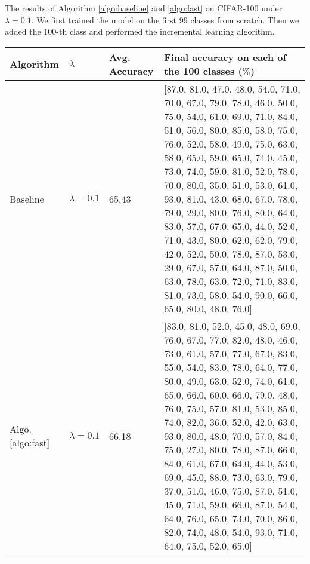 \begin{table}[!hpb]
	\centering
	{The results of Algorithm \ref{algo:baseline} and \ref{algo:fast} on CIFAR-100 under $\lambda=0.1$. We first trained the model on the first 99 classes from scratch. Then we added the 100-th class and performed the incremental learning algorithm.}
	\begin{tabular}{@{}lllp{8cm}@{}} \toprule
		Algorithm & $\lambda$ &Avg. Accuracy&  Final accuracy on each of the 100 classes ($\%$)\\ \midrule
		Baseline&$\lambda=0.1$&  65.43& [87.0, 81.0, 47.0, 48.0, 54.0, 71.0, 70.0, 67.0, 79.0, 78.0, 46.0, 50.0, 75.0, 54.0, 61.0, 69.0, 71.0, 84.0, 51.0, 56.0, 80.0, 85.0, 58.0, 75.0, 76.0, 52.0, 58.0, 49.0, 75.0, 63.0, 58.0, 65.0, 59.0, 65.0, 74.0, 45.0, 73.0, 74.0, 59.0, 81.0, 52.0, 78.0, 70.0, 80.0, 35.0, 51.0, 53.0, 61.0, 93.0, 81.0, 43.0, 68.0, 67.0, 78.0, 79.0, 29.0, 80.0, 76.0, 80.0, 64.0, 83.0, 57.0, 67.0, 65.0, 44.0, 52.0, 71.0, 43.0, 80.0, 62.0, 62.0, 79.0, 42.0, 52.0, 50.0, 78.0, 87.0, 53.0, 29.0, 67.0, 57.0, 64.0, 87.0, 50.0, 63.0, 78.0, 63.0, 72.0, 71.0, 83.0, 81.0, 73.0, 58.0, 54.0, 90.0, 66.0, 65.0, 80.0, 48.0, 76.0]\\
		Algo. \ref{algo:fast}&$\lambda=0.1$&  66.18& [83.0, 81.0, 52.0, 45.0, 48.0, 69.0, 76.0, 67.0, 77.0, 82.0, 48.0, 46.0, 73.0, 61.0, 57.0, 77.0, 67.0, 83.0, 55.0, 54.0, 83.0, 78.0, 64.0, 77.0, 80.0, 49.0, 63.0, 52.0, 74.0, 61.0, 65.0, 66.0, 60.0, 66.0,
		79.0, 48.0, 76.0, 75.0, 57.0, 81.0, 53.0, 85.0, 74.0, 82.0, 36.0, 52.0, 42.0, 63.0, 93.0, 80.0, 48.0, 70.0, 57.0, 84.0, 75.0, 27.0, 80.0, 78.0, 87.0, 66.0, 84.0, 61.0, 67.0, 64.0, 44.0, 53.0, 69.0, 45.0,
		88.0, 73.0, 63.0, 79.0, 37.0, 51.0, 46.0, 75.0, 87.0, 51.0, 45.0, 71.0, 59.0, 66.0, 87.0, 54.0, 64.0, 76.0, 65.0, 73.0, 70.0, 86.0, 82.0, 74.0, 48.0, 54.0, 93.0, 71.0, 64.0, 75.0, 52.0, 65.0]
		\\ \bottomrule
		\label{tab:fast0.1}
	\end{tabular}
\end{table}

